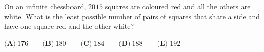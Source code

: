 On an infinite chessboard, $2015$ squares are coloured red and all the others are white. What is the least possible number of pairs of squares that share a side and have one square red and the other white?

$\textbf{(A)}\ 176\qquad\textbf{(B)}\ 180\qquad\textbf{(C)}\ 184\qquad\textbf{(D)}\ 188\qquad\textbf{(E)}\ 192$
